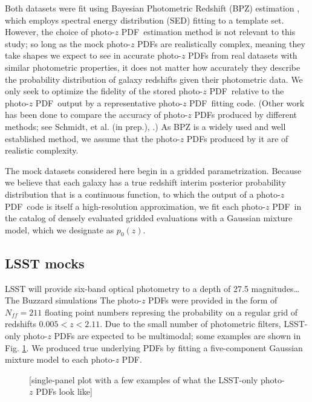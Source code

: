 \documentclass[\docopts]{\docclass}
\newcommand{\pz}{photo-$z$ PDF}
\begin{document}
Both datasets were fit using Bayesian Photometric Redshift (BPZ) estimation 
\citep{benitez_bayesian_2000}, which employs spectral energy distribution (SED) 
fitting to a template set.  However, the choice of \pz\ estimation method is 
not relevant to this study; so long as the mock \pz s are realistically 
complex, meaning they take shapes we expect to see in accurate \pz s from real 
datasets with similar photometric properties, it does not matter how accurately 
they describe the probability distribution of galaxy redshifts given their 
photometric data.  We only seek to optimize the fidelity of the stored \pz\ 
relative to the \pz\ output by a representative \pz\ fitting code.  (Other work 
has been done to compare the accuracy of \pz s produced by different methods; 
see Schmidt, et al. (in prep.), \citet{tanaka_photometric_2017}.)  As BPZ is a 
widely used and well established method, we assume that the \pz s produced by 
it are of realistic complexity.

The mock datasets considered here begin in a gridded parametrization.  Because 
we believe that each galaxy has a true redshift interim posterior probability 
distribution that is a continuous function, to which the output of a \pz\ code 
is itself a high-resolution approximation, we fit each \pz\ in the catalog of 
densely evaluated gridded evaluations with a Gaussian mixture model, which we 
designate as $p_{0}(z)$.

\subsection{LSST mocks}
\label{sec:ss}


LSST will provide six-band optical photometry to a depth of 27.5 
magnitudes\dots  The Buzzard simulations The \pz s were provided in the form of 
$N_{ff}=211$ floating point numbers represing the probability on a regular grid 
of redshifts $0.005 < z < 2.11$.  Due to the small number of photometric 
filters, LSST-only \pz s are expected to be multimodal; some examples are shown 
in Fig. \ref{fig:ss}.  We produced true underlying PDFs by fitting a 
five-component Gaussian mixture model to each \pz.

\begin{figure}
  \caption{[single-panel plot with a few examples of what the LSST-only \pz s 
look like]
  \label{fig:ss}}
\end{figure}
\end{document}
